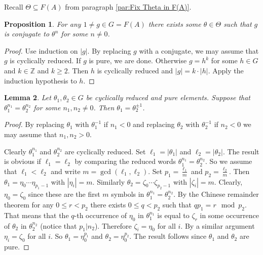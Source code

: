 \documentclass[12pt]{amsart}
\newtheorem{prop}{Proposition}[section]
\newtheorem{lemma}[prop]{Lemma}
\theoremstyle{definition}
\def\ZZ{\ensuremath{\mathbb{Z}}}
\newcommand{\OP}[1]{\operatorname{#1}}
\def\Free{F}
\begin{document}
Recall $\Theta \subseteq \Free(A)$ from paragraph \ref{par:Fix Theta in F(A)}.


\begin{prop}\label{P:pure roots}
For any $1 \neq g \in G=\Free(A)$ there exists some $\theta \in \Theta$ such that $g$ is conjugate to $\theta^n$ for some $n \neq 0$.
\end{prop}

\begin{proof}
Use induction on $|g|$.
By replacing $g$ with a conjugate, we may assume that $g$ is cyclically reduced.
If $g$ is pure, we are done.
Otherwise $g=h^k$ for some $h \in G$ and $k \in \ZZ$ and $k \geq 2$.
Then $h$ is cyclically reduced and $|g|=k \cdot |h|$.
Apply the induction hypothesis to $h$.
\end{proof}





\begin{lemma}\label{L:Theta is pure}
Let $\theta_1, \theta_2 \in G$ be cyclically reduced and pure elements.
Suppose that $\theta_1^{n_1}=\theta_2^{n_2}$ for some $n_1,n_2 \neq 0$.
Then $\theta_1=\theta_2^{\pm 1}$.
\end{lemma}

\begin{proof}
By replacing $\theta_1$ with $\theta_1^{-1}$ if $n_1<0$ and replacing $\theta_2$ with $\theta_2^{-1}$ if $n_2<0$ we may assume that $n_1,n_2>0$.

Clearly $\theta_1^{n_1}$ and $\theta_2^{n_2}$ are cyclically reduced.
Set $\ell_1=|\theta_1|$ and $\ell_2=|\theta_2|$.
The result is obvious if $\ell_1=\ell_2$ by comparing the reduced words $\theta_1^{n_1}=\theta_2^{n_2}$.
So we assume that $\ell_1<\ell_2$ and write $m=\OP{gcd}(\ell_1,\ell_2)$.
Set $p_1=\tfrac{\ell_1}{m}$ and $p_2=\tfrac{\ell_2}{m}$.
Then $\theta_1=\eta_0 \cdots \eta_{p_1-1}$ with $|\eta_i|=m$.
Similarly $\theta_2=\zeta_0 \cdots \zeta_{p_2-1}$ with $|\zeta_i|=m$.
Clearly, $\eta_0=\zeta_0$ since these are the first $m$ symbols in $\theta_1^{n_1}=\theta_2^{n_2}$.
By the Chinese remainder theorem for any $0 \leq r <p_2$ there exists $0 \leq q < p_2$ such that $q p_1 = r \mod p_2$.
That means that the $q$-th occurrence of $\eta_0$ in $\theta_1^{n_1}$ is equal to $\zeta_r$ in some occurrence of $\theta_2$ in $\theta_2^{n_2}$ (notice that $p_1| n_2$).
Therefore $\zeta_i=\eta_0$ for all $i$.
By a similar argument $\eta_i=\zeta_0$ for all $i$.
So $\theta_1=\eta_0^{p_1}$ and $\theta_2=\eta_0^{p_2}$.
The result follows since $\theta_1$ and $\theta_2$ are pure.
\end{proof}
\end{document}

